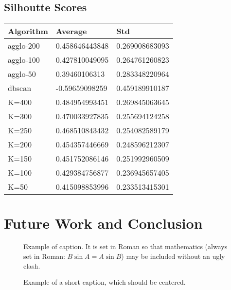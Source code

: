 \documentclass[10pt,twocolumn,letterpaper]{article}
\begin{document}
\subsection{Silhoutte Scores}
\begin{table}
  \begin{tabular}{|l|l|l|}
    \hline
    Algorithm & Average & Std \\
    \hline
    agglo-200 & 0.458646443848 & 0.269008683093 \\
    agglo-100 & 0.427810049095 & 0.264761260823 \\
    agglo-50 & 0.39460106313 & 0.283348220964 \\
    \hline
    dbscan & -0.59659098259 & 0.459189910187  \\
    \hline
    K=400 & 0.484954993451  & 0.269845063645 \\

    K=300 & 0.470033927835 & 0.255694124258 \\
    K=250 & 0.468510843432 & 0.254082589179 \\
    K=200 & 0.454357446669 & 0.248596212307 \\
    K=150 & 0.451752086146 & 0.251992960509 \\
    K=100 & 0.429384756877 & 0.236945657405 \\
    K=50 & 0.415098853996 & 0.233513415301 \\
    \hline
    
  \end{tabular}
\end{table}

\section{Future Work and Conclusion}

\begin{figure}[t]
\begin{center}
\fbox{\rule{0pt}{2in} \rule{0.9\linewidth}{0pt}}
\end{center}
   \caption{Example of caption.  It is set in Roman so that mathematics
   (always set in Roman: $B \sin A = A \sin B$) may be included without an
   ugly clash.}
\label{fig:long}
\label{fig:onecol}
\end{figure}



\begin{figure*}
\begin{center}
\fbox{\rule{0pt}{2in} \rule{.9\linewidth}{0pt}}
\end{center}
   \caption{Example of a short caption, which should be centered.}
\label{fig:short}
\end{figure*}


{\small


}
\end{document}
